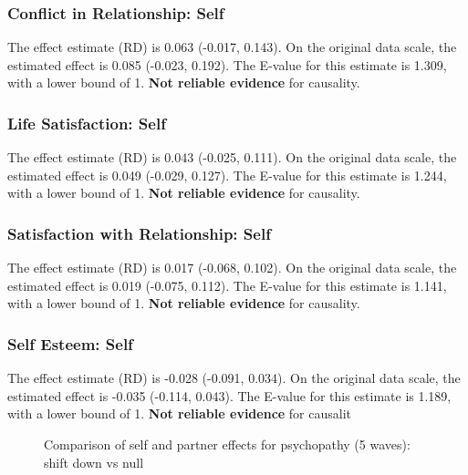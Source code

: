 \documentclass[
  singlecolumn]{article}
\begin{document}
\subsubsection{Conflict in Relationship:
Self}\label{conflict-in-relationship-self-18}

The effect estimate (RD) is 0.063 (-0.017, 0.143). On the original data
scale, the estimated effect is 0.085 (-0.023, 0.192). The E-value for
this estimate is 1.309, with a lower bound of 1. \textbf{Not reliable
evidence} for causality.

\subsubsection{Life Satisfaction: Self}\label{life-satisfaction-self-18}

The effect estimate (RD) is 0.043 (-0.025, 0.111). On the original data
scale, the estimated effect is 0.049 (-0.029, 0.127). The E-value for
this estimate is 1.244, with a lower bound of 1. \textbf{Not reliable
evidence} for causality.

\subsubsection{Satisfaction with Relationship:
Self}\label{satisfaction-with-relationship-self-18}

The effect estimate (RD) is 0.017 (-0.068, 0.102). On the original data
scale, the estimated effect is 0.019 (-0.075, 0.112). The E-value for
this estimate is 1.141, with a lower bound of 1. \textbf{Not reliable
evidence} for causality.

\subsubsection{Self Esteem: Self}\label{self-esteem-self-18}

The effect estimate (RD) is -0.028 (-0.091, 0.034). On the original data
scale, the estimated effect is -0.035 (-0.114, 0.043). The E-value for
this estimate is 1.189, with a lower bound of 1. \textbf{Not reliable
evidence} for causalit

\begin{figure}


\caption{\label{fig-results-psychopathy-self-partner-down-long-comparison}Comparison
of self and partner effects for psychopathy (5 waves): shift down vs
null}

\end{figure}%
\end{document}
